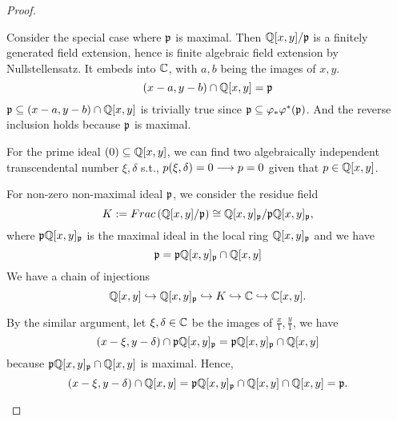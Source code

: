 \begin{proof}
\begin{enumerate}[label=(\alph*)]
Consider the special case where ${\mathfrak p}$ is maximal. Then $\mathbb Q[x,y]/{\mathfrak p}$ is a finitely generated field extension, hence is finite algebraic field extension by Nullstellensatz. It embeds into $\mathbb C$, with $a,b$ being the images of $x,y$.
$$
(x-a,y-b)\cap \mathbb Q[x,y]={\mathfrak p}
$$
${\mathfrak p}\subseteq (x-a,y-b)\cap \mathbb Q[x,y]$ is trivially true since ${\mathfrak p}\subseteq \varphi_*\varphi^*({\mathfrak p})$. And the reverse inclusion holds because ${\mathfrak p}$ is maximal.

For the prime ideal $(0)\subseteq \mathbb Q[x,y]$, we can find two algebraically independent transcendental number $\xi,\delta$ s.t., $p(\xi,\delta)=0\longrightarrow p=0$ given that $p\in \mathbb Q[x,y]$.

For non-zero non-maximal ideal ${\mathfrak p}$, we consider the residue field
$$
K:=Frac\left(\mathbb Q[x,y]/{\mathfrak p}\right)\cong \mathbb Q[x,y]_{\mathfrak p}/{\mathfrak p}\mathbb Q[x,y]_{\mathfrak p},
$$
where ${\mathfrak p}\mathbb Q[x,y]_{\mathfrak p}$ is the maximal ideal in the local ring $\mathbb Q[x,y]_{\mathfrak p}$ and we have
$$
{\mathfrak p}={\mathfrak p}\mathbb Q[x,y]_{\mathfrak p}\cap \mathbb Q[x,y]
$$
We have a chain of injections
$$
\mathbb Q[x,y]\hookrightarrow\mathbb Q[x,y]_{\mathfrak p}\hookrightarrow K\hookrightarrow \mathbb C\hookrightarrow\mathbb C[x,y].
$$

By the similar argument, let $\xi,\delta\in \mathbb C$ be the images of $\frac{x}{1},\frac{y}{1}$, we have 
$$
(x-\xi,y-\delta)\cap {\mathfrak p}\mathbb Q[x,y]_{\mathfrak p}={\mathfrak p}\mathbb Q[x,y]_{\mathfrak p}\cap \mathbb Q[x,y]
$$ 
because ${\mathfrak p}\mathbb Q[x,y]_{\mathfrak p}\cap \mathbb Q[x,y]$ is maximal. Hence,
$$
(x-\xi,y-\delta)\cap \mathbb Q[x,y]={\mathfrak p}\mathbb Q[x,y]_{\mathfrak p}\cap \mathbb Q[x,y]\cap \mathbb Q[x,y]={\mathfrak p}.
$$



\end{enumerate}
\end{proof}

